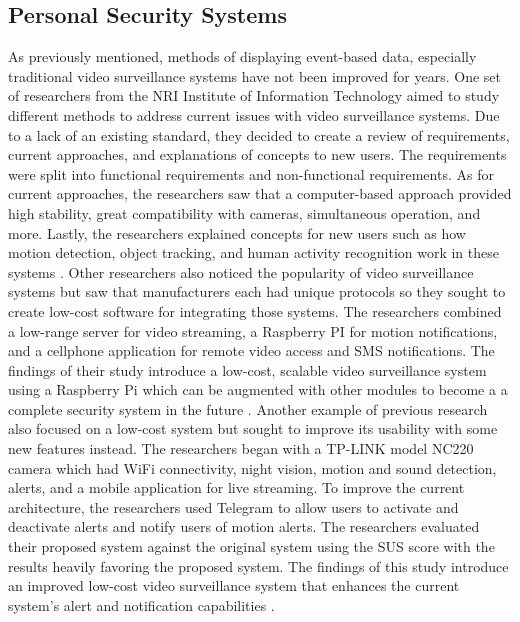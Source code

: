 \documentclass[doublespace,draft,nopageskip]{VTthesis} %
\begin{document}
\subsection{Personal Security Systems} \label{ss:this_subsection}
As previously mentioned, methods of displaying event-based data, especially traditional video surveillance systems have not been improved for years. 
One set of researchers from the  NRI Institute of Information Technology aimed to study different methods to address current issues with video surveillance systems. Due to a lack of an existing standard, they decided to create a review of requirements, current approaches, and explanations of concepts to new users. The requirements were split into functional requirements and non-functional requirements. As for current approaches, the researchers saw that a computer-based approach provided high stability, great compatibility with cameras, simultaneous operation, and more. Lastly, the researchers explained concepts for new users such as how motion detection, object tracking, and human activity recognition work in these systems \cite{kaleReviewSecuringHome2012}.
Other researchers also noticed the popularity of video surveillance systems but saw that manufacturers each had unique protocols so they sought to create low-cost software for integrating those systems. The researchers combined a low-range server for video streaming, a Raspberry PI for motion notifications, and a cellphone application for remote video access and SMS notifications. The findings of their study introduce a low-cost, scalable video surveillance system using a Raspberry Pi which can be augmented with other modules to become a a complete security system in the future \cite{abrilDevelopmentDesignUnified2020}.
Another example of previous research also focused on a low-cost system but sought to improve its usability with some new features instead. The researchers began with a TP-LINK model NC220 camera which had WiFi connectivity, night vision, motion and sound detection, alerts, and a mobile application for live streaming. To improve the current architecture, the researchers used Telegram to allow users to activate and deactivate alerts and notify users of motion alerts. The researchers evaluated their proposed system against the original system using the SUS score with the results heavily favoring the proposed system. The findings of this study introduce an improved low-cost video surveillance system that enhances the current system's alert and notification capabilities \cite{abasoloImprovingUsabilityIntrusion2021}. 
\end{document}
